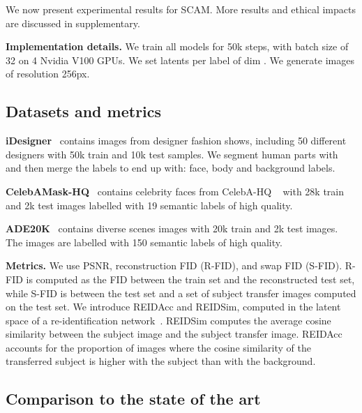 \documentclass[runningheads]{llncs}
\makeatletter
\newcommand{\mname}{SCAM\@\xspace}
\makeatother
\begin{document}
We now present experimental results for \mname . More results and ethical impacts are discussed in supplementary.

\noindent \textbf{Implementation details.}
We train all models for 50k steps, with batch size of 32 on 4 Nvidia V100 GPUs. We set  latents per label of dim . We generate images of resolution 256px.



\subsection{Datasets and metrics}




\noindent \textbf{iDesigner}~\cite{idesigner} contains images from designer fashion shows, including 50 different designers with 50k train and 10k test samples.
We segment human parts with~\cite{li2019selfcorrection} and then merge the labels to end up with: face, body and background labels.

\noindent \textbf{CelebAMask-HQ}~\cite{lee2020maskgan} contains celebrity faces from CelebA-HQ ~\cite{karras2018progressive} with 28k train and 2k test images labelled with 19 semantic labels of high quality. 

\noindent \textbf{ADE20K}~\cite{zhou2017scene} contains diverse scenes images with 20k train and 2k test images. The images are labelled with 150 semantic labels of high quality.

\noindent \textbf{Metrics.} We use PSNR, reconstruction FID (R-FID), and swap FID (S-FID). R-FID is computed as the FID between the train set and the reconstructed test set, while S-FID is between the test set and a set of subject transfer images computed on the test set. We introduce REIDAcc and REIDSim, computed in the latent space of a re-identification network~\cite{fu2021unsupervised}. REIDSim computes the average cosine similarity between the subject image and the subject transfer image. REIDAcc accounts for the proportion of images where the cosine similarity of the transferred subject is higher with the subject than with the background.

\subsection{Comparison to the state of the art}
\end{document}
